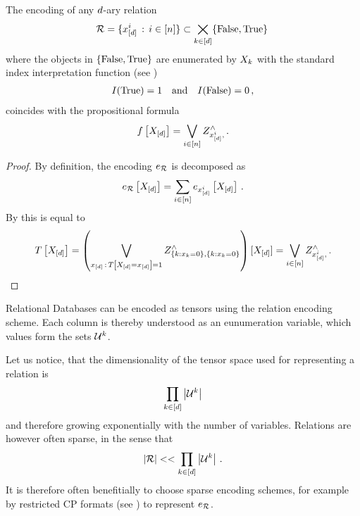 \begin{theorem}
    The encoding of any $d$-ary relation
    \begin{align*}
        \mathcal{R} = \{ x_{[d]}^{i} \, : \, i\in[n] \} \subset \bigtimes_{k\in[d]} \{\mathrm{False},\mathrm{True}\} \,
    \end{align*}
    where the objects in $\{\mathrm{False},\mathrm{True}\}$ are enumerated by $X_{k}$ with the standard index interpretation function (see )
    \begin{align*}
        I(\mathrm{True}) = 1 \quad \text{and} \quad I(\mathrm{False}) = 0 \, ,
    \end{align*}
    coincides with the propositional formula
    \begin{align*}
        f\left[X_{[d]}\right] = \bigvee_{i\in[n]} Z^{\land}_{x_{[d]}^{i},\,} .
    \end{align*}
\end{theorem}
\begin{proof}
    By definition, the encoding $e_{\mathcal{R}}$ is decomposed as
    \begin{align*}
        e_{\mathcal{R}}\left[X_{[d]}\right]
        = \sum_{i\in[n]} e_{x_{[d]}^{i}}\left[X_{[d]}\right] \, .
    \end{align*}
    By  this is equal to
    \begin{align*}
        T\left[X_{[d]}\right] = \left( \bigvee_{x_{[d]} \, : \, T\left[X_{[d]}=x_{[d]}\right] = 1}
        Z^{\land}_{\{k : x_{k}=0\},\{k : x_{k}=0\}}
        \right)[X_{[d]}]
        = \bigvee_{i\in[n]} Z^{\land}_{x_{[d]}^{i},\,} .
    \end{align*}
\end{proof}


\begin{example}
    Relational Databases can be encoded as tensors using the relation encoding scheme.
    Each column is thereby understood as an eunumeration variable, which values form the sets $\mathcal{U}^{k}$.
\end{example}

Let us notice, that the dimensionality of the tensor space used for representing a relation is
\begin{align*}
    \prod_{k\in[d]} \left|\mathcal{U}^{k}\right|
\end{align*}
and therefore growing exponentially with the number of variables.
Relations are however often sparse, in the sense that
\begin{align*}
    \left|\mathcal{R}\right| << \prod_{k\in[d]} \left|\mathcal{U}^{k}\right| \, .
\end{align*}
It is therefore often benefitially to choose sparse encoding schemes, for example by restricted CP formats (see ) to represent $e_{\mathcal{R}}$.



